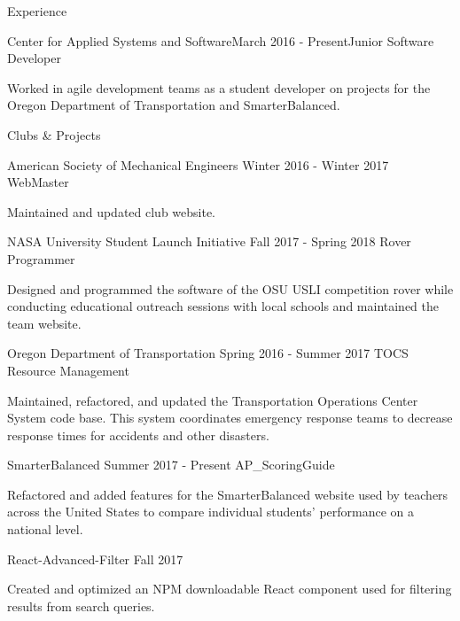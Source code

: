 \documentclass{resume} %
\begin{document}
  \begin{rSection}{Experience}
  
    \begin{rSubsection}{Center for Applied Systems and Software}{March 2016 - Present}{Junior Software Developer}{}
    \item Worked in agile development teams as a student developer on projects for the Oregon  Department of Transportation and SmarterBalanced.
    \end{rSubsection}
  
  \end{rSection}
  
  
  \begin{rSection}{Clubs \& Projects}
    \begin{rSubsection} {American Society of Mechanical Engineers} {Winter 2016 - Winter 2017} {WebMaster} {}
    \item Maintained and updated club website.
    \end{rSubsection}
      
    \begin{rSubsection} {NASA University Student Launch Initiative} {Fall 2017 - Spring 2018} {Rover Programmer} {}
    \item Designed and programmed the software of the OSU USLI competition rover while conducting educational outreach sessions with local schools and maintained the team website.
    \end{rSubsection}
  
    \begin{rSubsection} {Oregon Department of Transportation} {Spring 2016 - Summer 2017} {TOCS Resource Management} {}
    \item Maintained, refactored, and updated the Transportation Operations Center System code base. This system coordinates emergency response teams to decrease response times for accidents and other disasters.
    \end{rSubsection}
  
    \begin{rSubsection} {SmarterBalanced} {Summer 2017 - Present} {AP\_ScoringGuide} {}
    \item Refactored and added features for the SmarterBalanced website used by teachers across the United States to compare individual students' performance on a national level.
    \end{rSubsection}
  
    \begin{rSubsection} {React-Advanced-Filter} {Fall 2017} {} {}
    \item Created and optimized an NPM downloadable React component used for filtering results from search queries.
    \end{rSubsection}
  
  \end{rSection}
  
  
  
  
\end{document}
